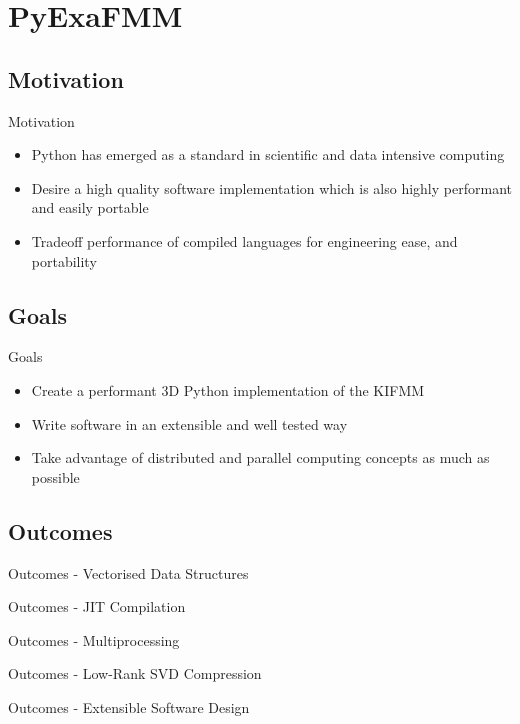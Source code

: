 \section{PyExaFMM}

\subsection{Motivation}
\begin{frame}{Motivation}
    \begin{itemize}
        \item Python has emerged as a standard in scientific and data intensive computing
        \item Desire a high quality software implementation which is also highly performant and easily portable
        \item Tradeoff performance of compiled languages for engineering ease, and portability
    \end{itemize}
\end{frame}

\subsection{Goals}
\begin{frame}{Goals}
    \begin{itemize}
        \item Create a performant 3D Python implementation of the KIFMM
        \item Write software in an extensible and well tested way
        \item Take advantage of distributed and parallel computing concepts as much as possible
    \end{itemize}
\end{frame}

\subsection{Outcomes}
\begin{frame}{Outcomes - Vectorised Data Structures}
\end{frame}

\begin{frame}{Outcomes - JIT Compilation}
\end{frame}

\begin{frame}{Outcomes - Multiprocessing}
\end{frame}

\begin{frame}{Outcomes - Low-Rank SVD Compression}
\end{frame}

\begin{frame}{Outcomes - Extensible Software Design}
\end{frame}

